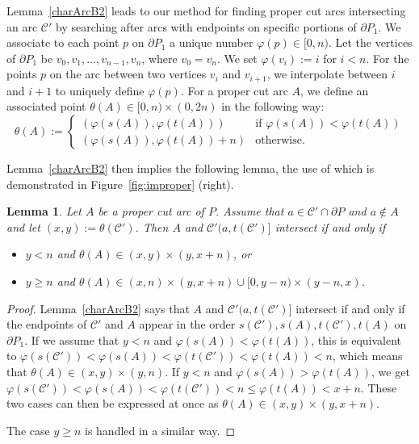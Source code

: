 \documentclass{article}
\newcommand{\PP}{P}
\newcommand{\cut}{\mathcal C}
\newcommand{\start}{s}
\newcommand{\terminal}{t}
\newcommand{\arcA}{A}
\newcommand{\mydef}{:=}
\newtheorem{lemma}[theorem]{Lemma}
\begin{document}
Lemma~\ref{charArcB2} leads to our method for finding proper cut arcs intersecting
an arc $\cut'$ by searching after arcs with endpoints on specific portions of
$\partial\PP_1$.
We associate to each point $p$ on $\partial\PP_1$ a unique number
$\varphi(p)\in[0,n)$. Let the vertices of $\partial\PP_1$ be
$v_0,v_1,\ldots,v_{n-1},v_n$, where $v_0=v_n$. We set
$\varphi(v_i)\mydef i$ for $i<n$.
For the points $p$ on the arc between two vertices $v_i$ and
$v_{i+1}$, we interpolate between $i$ and $i+1$ to uniquely define $\varphi(p)$.
For a proper cut arc $\arcA$,
we define an associated point $\theta(\arcA)\in[0,n)\times(0,2n)$
in the following way:
$$
\theta(\arcA)\mydef
\begin{cases}
(\varphi(\start(\arcA)),\varphi(\terminal(\arcA))) & \textrm{if }\varphi(\start(\arcA))<\varphi(\terminal(\arcA)) \\
(\varphi(\start(\arcA)),\varphi(\terminal(\arcA))+n) & \textrm{otherwise}.
\end{cases}
$$

Lemma~\ref{charArcB2} then implies the following lemma, the use of which is demonstrated in Figure~\ref{fig:improper} (right).

\begin{lemma}\label{charArcB3}
Let $\arcA$ be a proper cut arc of $\PP$.
Assume that $a\in\cut'\cap\partial\PP$ and $a\notin\arcA$ and let $(x,y)\mydef \theta(\cut')$.
Then $\arcA$ and $\cut'(a,\terminal(\cut')]$ intersect
if and only if
\begin{itemize}
\item
$y<n$ and $\theta(\arcA)\in (x,y)\times (y,x+n)$, or

\item
$y\geq n$ and $\theta(\arcA)\in (x,n)\times (y,x+n)\cup [0,y-n)\times (y-n,x)$.
\end{itemize}
\end{lemma}

\begin{proof}
Lemma~\ref{charArcB2} says that $\arcA$ and $\cut'(a,\terminal(\cut')]$
intersect if and only if the endpoints of $\cut'$ and $\arcA$ appear in the order
$\start(\cut'),\start(\arcA),\terminal(\cut'),\terminal(\arcA)$
on $\partial\PP_1$.
If we assume that $y<n$ and $\varphi(\start(\arcA))<\varphi(\terminal(\arcA))$,
this is equivalent to
$\varphi(\start(\cut'))<\varphi(\start(\arcA))<\varphi(\terminal(\cut'))
<\varphi(\terminal(\arcA))<n$, which means that
$\theta(\arcA)\in (x,y)\times (y,n)$.
If $y<n$ and $\varphi(\start(\arcA))>\varphi(\terminal(\arcA))$, we get $\varphi(\start(\cut'))<\varphi(\start(\arcA))<\varphi(\terminal(\cut'))<n\leq
\varphi(\terminal(\arcA))<x+n$.
These two cases can then be expressed at once as $\theta(\arcA)\in (x,y)\times (y,x+n)$.

The case $y\geq n$ is handled in a similar way.
\end{proof}
\end{document}
